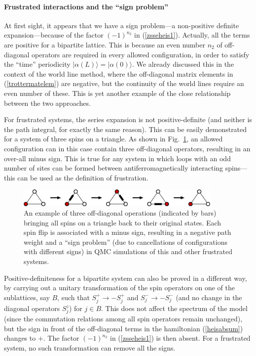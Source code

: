 \documentclass[draft,numberedheadings]{aipproc}
\begin{document}
\paragraph{Frustrated interactions and the ``sign problem''}

At first sight, it appears that we have a sign problem---a non-positive definite expansion---because of the factor $(-1)^{n_2}$ in (\ref{zsseheis1}). Actually, 
all the terms are positive for a bipartite lattice. This is because an even number $n_2$ of off-diagonal operators are required in every allowed configuration, 
in order to satisfy the ``time'' periodicity $|\alpha(L)\rangle=|\alpha(0)\rangle$. We already discussed this in the context of the world line method, where 
the off-diagonal matrix elements in (\ref{trottermatelem}) are negative, but the continuity of the world lines require an even number of these. This is yet
another example of the close relationship between the two approaches.

For frustrated systems, the series expansion is not positive-definite (and neither is the path integral, for exactly the same reason). This can be easily 
demonstrated for a system of three spins on a triangle. As shown in Fig.~\ref{triangle}, an allowed configuration can in this case contain three off-diagonal 
operators, resulting in an over-all minus sign. This is true for any system in which loops with an odd number of sites can be formed between antiferromagnetically 
interacting spins---this can be used as the definition of frustration. 

\begin{figure}
\includegraphics[width=10cm]{triangle.eps}
\caption{An example of three off-diagonal operations (indicated by bars) bringing all spins on a triangle back to their original states. 
Each spin flip is associated with a minus sign, resulting in a negative path weight and a ``sign problem'' (due to cancellations of
configurations with different signs) in QMC simulations of this and other frustrated systems.}
\label{triangle}
\end{figure}

Positive-definiteness for a bipartite system can also be proved in a different way, by carrying out a unitary transformation of the spin operators on one of
the sublattices, say $B$, such that $S^+_j \to - S^+_j$ and $S^-_j \to - S^-_j$ (and no change in the diagonal operators $S^z_j$) for $j \in B$. This does not 
affect the spectrum of the model (since the commutation relations among all spin operators remain unchanged), but the sign in front of the off-diagonal terms 
in the hamiltonian (\ref{heisabsum}) changes to $+$. The factor $(-1)^{n_2}$ in (\ref{zsseheis1}) is then absent. For a frustrated system, no such 
transformation can remove all the signs.
\end{document}
